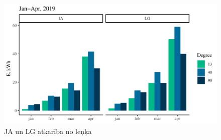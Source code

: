 \begin{figure}[h]
    \centering
    \includegraphics[width=\linewidth]{figures/results/degType.pdf}
    \caption{JA un LG atkarība no leņķa}
    \label{fig:lg_ja_deg}
\end{figure}